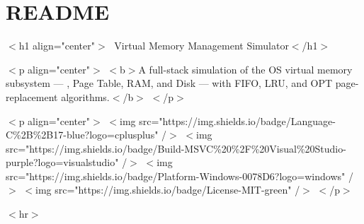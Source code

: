 \chapter{README }
\hypertarget{md__r_e_a_d_m_e}{}\label{md__r_e_a_d_m_e}
\texorpdfstring{$<$}{<}h1 align="{}center"{}\texorpdfstring{$>$}{>}🧠 Virtual Memory Management Simulator\texorpdfstring{$<$}{<}/\+h1\texorpdfstring{$>$}{>}

\texorpdfstring{$<$}{<}p align="{}center"{}\texorpdfstring{$>$}{>} \texorpdfstring{$<$}{<}b\texorpdfstring{$>$}{>}A full-\/stack simulation of the OS virtual memory subsystem — , Page Table, RAM, and Disk — with FIFO, LRU, and OPT page-\/replacement algorithms.\texorpdfstring{$<$}{<}/\+b\texorpdfstring{$>$}{>} \texorpdfstring{$<$}{<}/\+p\texorpdfstring{$>$}{>}

\texorpdfstring{$<$}{<}p align="{}center"{}\texorpdfstring{$>$}{>} \texorpdfstring{$<$}{<}img src="{}https:\+/\+/\+img.\+shields.\+io/\+badge/\+\+Language-\/\+C\%2\+B\%2\+B17-\/blue?logo=cplusplus"{} /\+\texorpdfstring{$>$}{>} \texorpdfstring{$<$}{<}img src="{}https:\+/\+/\+img.\+shields.\+io/\+badge/\+\+Build-\/\+MSVC\%20\%2\+F\%20\+Visual\%20\+Studio-\/purple?logo=visualstudio"{} /\+\texorpdfstring{$>$}{>} \texorpdfstring{$<$}{<}img src="{}https:\+/\+/\+img.\+shields.\+io/\+badge/\+\+Platform-\/\+Windows-\/0078\+D6?logo=windows"{} /\+\texorpdfstring{$>$}{>} \texorpdfstring{$<$}{<}img src="{}https:\+/\+/\+img.\+shields.\+io/\+badge/\+\+License-\/\+MIT-\/green"{} /\+\texorpdfstring{$>$}{>} \texorpdfstring{$<$}{<}/\+p\texorpdfstring{$>$}{>}

\texorpdfstring{$<$}{<}hr\texorpdfstring{$>$}{>}